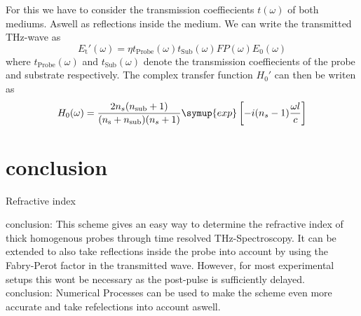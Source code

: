 \documentclass[aspectratio=1610, 9pt]{beamer}
\begin{document}
\begin{frame}
  For this we have to consider the transmission coeffiecients $t(\omega)$ of both mediums.
  Aswell as reflections inside the medium.
  We can write the transmitted THz-wave as
  \begin{equation}
    E_\text{t} '(\omega) = \eta t_\text{Probe}(\omega) t_\text{Sub}(\omega)FP(\omega)E_0(\omega)
  \end{equation}
  where $t_\text{Probe}(\omega)$ and $t_\text{Sub}(\omega)$ denote the transmission coeffiecients of the probe and substrate respectively.
  The complex transfer function $H_0'$ can then be writen as 
  \begin{equation}
    H_0(\omega) = \frac{2 n_s(n_\text{sub} + 1)}{(n_\text{s} + n_\text{sub})(n_s + 1)} \symup{exp}\left[ - i (n_s - 1) \frac{\omega l }{c}\right]
  \end{equation}
\end{frame}

\section{conclusion}
\begin{frame}{Refractive index}
  \begin{center}
  \textcolor{tugreen}{conclusion:}
  This scheme gives an easy way to determine the refractive index of thick homogenous probes through time resolved THz-Spectroscopy.
  It can be extended to also take reflections inside the probe into account by using the Fabry-Perot factor in the transmitted wave.
  However, for most experimental setups this wont be necessary as the post-pulse is sufficiently delayed.\\
  \textcolor{tugreen}{conclusion:}
  Numerical Processes can be used to make the scheme even more accurate and take refelections into account aswell.
\end{center}
\end{frame}
\end{document}

